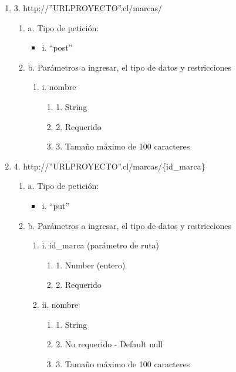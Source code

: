 \begin{enumerate}
    \item 3. http://”URLPROYECTO”.cl/marcas/
    \begin{enumerate}
        \item a. Tipo de petición:
            \begin{itemize}
               \item i. “post”
            \end{itemize}
        \item b. Parámetros a ingresar, el tipo de datos y restricciones
            \begin{enumerate}
                \item i. nombre
                    \begin{enumerate}
                        \item 1. String
                        \item 2. Requerido
                        \item 3. Tamaño máximo de 100 caracteres
                    \end{enumerate}
            \end{enumerate}
    \end{enumerate}

    \item 4. http://”URLPROYECTO”.cl/marcas/\{id\_marca\}
    \begin{enumerate}
        \item a. Tipo de petición:
            \begin{itemize}
               \item i. “put”
            \end{itemize}
        \item b. Parámetros a ingresar, el tipo de datos y restricciones
            \begin{enumerate}
                \item i. id\_marca (parámetro de ruta)
                    \begin{enumerate}
                        \item 1. Number (entero)
                        \item 2. Requerido
                    \end{enumerate}
                \item ii. nombre
                    \begin{enumerate}
                        \item 1. String
                        \item 2. No requerido - Default null
                        \item 3. Tamaño máximo de 100 caracteres
                    \end{enumerate}
            \end{enumerate}
    \end{enumerate}


\end{enumerate}
